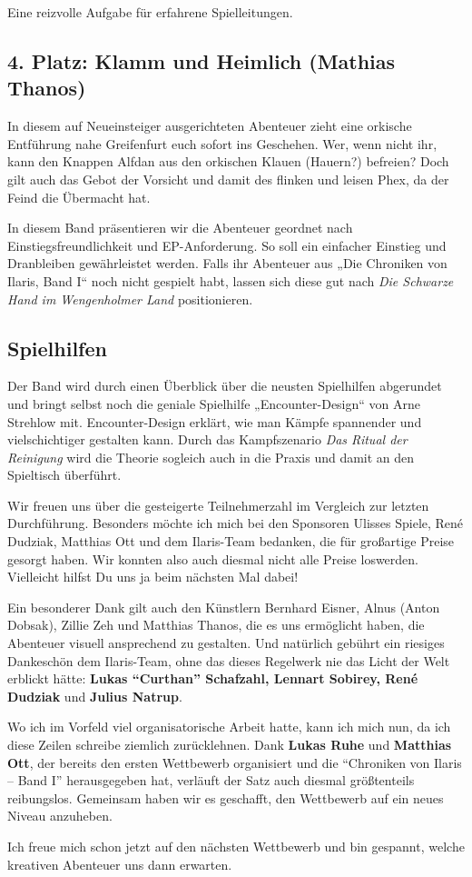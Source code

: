 Eine reizvolle Aufgabe für erfahrene Spielleitungen.

\neuespalte

\subsection*{4. Platz: Klamm und Heimlich (Mathias Thanos)}
In diesem auf Neueinsteiger ausgerichteten Abenteuer zieht eine orkische Entführung nahe Greifenfurt euch sofort ins Geschehen. Wer, wenn nicht ihr, kann den Knappen Alfdan aus den orkischen Klauen (Hauern?) befreien? Doch gilt auch das Gebot der Vorsicht und damit des flinken und leisen Phex, da der Feind die Übermacht hat.

\medskip

In diesem Band präsentieren wir die Abenteuer geordnet nach Einstiegsfreundlichkeit und EP-Anforderung. So soll ein einfacher Einstieg und Dranbleiben gewährleistet werden. Falls ihr Abenteuer aus „Die Chroniken von Ilaris, Band I“ noch nicht gespielt habt, lassen sich diese gut nach \textit{Die Schwarze Hand im Wengenholmer Land} positionieren.
\bigskip

\subsection*{Spielhilfen}
Der Band wird durch einen Überblick über die neusten Spielhilfen abgerundet und bringt selbst noch die geniale Spielhilfe „Encounter-Design“ von Arne Strehlow mit. Encounter-Design erklärt, wie man Kämpfe spannender und vielschichtiger gestalten kann. Durch das Kampfszenario \textit{Das Ritual der Reinigung} wird die Theorie sogleich auch in die Praxis und damit an den Spieltisch überführt.%

Wir freuen uns über die gesteigerte Teilnehmerzahl im Vergleich zur letzten Durchführung.
Besonders möchte ich mich bei den Sponsoren Ulisses Spiele, René Dudziak, Matthias Ott und dem Ilaris-Team bedanken, die für großartige Preise gesorgt haben. Wir konnten also auch diesmal nicht alle Preise loswerden.
Vielleicht hilfst Du uns ja beim nächsten Mal dabei!

Ein besonderer Dank gilt auch den Künstlern Bernhard Eisner, Alnus (Anton Dobsak), Zillie Zeh und Matthias Thanos, die es uns ermöglicht haben, die Abenteuer visuell ansprechend zu gestalten.
Und natürlich gebührt ein riesiges Dankeschön dem Ilaris-Team, ohne das dieses Regelwerk nie das Licht der Welt erblickt hätte:
\textbf{Lukas \enquote{Curthan} Schafzahl, Lennart Sobirey, René Dudziak} und \textbf{Julius Natrup}.

Wo ich im Vorfeld viel organisatorische Arbeit hatte, kann ich mich nun, da ich diese Zeilen schreibe ziemlich zurücklehnen. Dank \textbf{Lukas Ruhe} und \textbf{Matthias Ott}, der bereits den ersten Wettbewerb organisiert und die \enquote{Chroniken von Ilaris -- Band I} herausgegeben hat, verläuft der Satz auch diesmal größtenteils reibungslos. Gemeinsam haben wir es geschafft, den Wettbewerb auf ein neues Niveau anzuheben.

Ich freue mich schon jetzt auf den nächsten Wettbewerb und bin gespannt, welche kreativen Abenteuer uns dann erwarten.

\neueseite